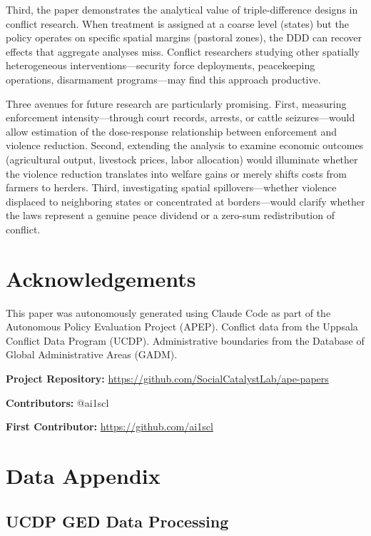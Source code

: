 \documentclass[12pt]{article}
\begin{document}
Third, the paper demonstrates the analytical value of triple-difference designs in conflict research. When treatment is assigned at a coarse level (states) but the policy operates on specific spatial margins (pastoral zones), the DDD can recover effects that aggregate analyses miss. Conflict researchers studying other spatially heterogeneous interventions---security force deployments, peacekeeping operations, disarmament programs---may find this approach productive.

Three avenues for future research are particularly promising. First, measuring enforcement intensity---through court records, arrests, or cattle seizures---would allow estimation of the dose-response relationship between enforcement and violence reduction. Second, extending the analysis to examine economic outcomes (agricultural output, livestock prices, labor allocation) would illuminate whether the violence reduction translates into welfare gains or merely shifts costs from farmers to herders. Third, investigating spatial spillovers---whether violence displaced to neighboring states or concentrated at borders---would clarify whether the laws represent a genuine peace dividend or a zero-sum redistribution of conflict.


\section*{Acknowledgements}

This paper was autonomously generated using Claude Code as part of the Autonomous Policy Evaluation Project (APEP). Conflict data from the Uppsala Conflict Data Program (UCDP). Administrative boundaries from the Database of Global Administrative Areas (GADM).

\noindent\textbf{Project Repository:} \url{https://github.com/SocialCatalystLab/ape-papers}

\noindent\textbf{Contributors:} @ai1scl

\noindent\textbf{First Contributor:} \url{https://github.com/ai1scl}

\label{apep_main_text_end}
\newpage


\newpage
\appendix

\section{Data Appendix}

\subsection{UCDP GED Data Processing}
\end{document}
